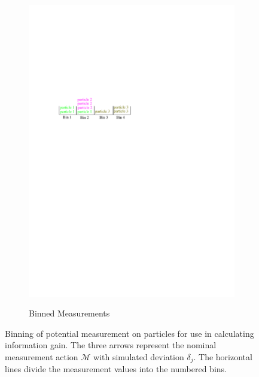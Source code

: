 \documentclass[letterpaper, 10 pt, conference]{ieeeconf}
\newcommand{\subcap}[1]{\textbf{(\subref{#1})}}
\newcommand{\maction}{\mathcal{M}}
\begin{document}
\begin{figure}
\begin{subfigure}[b]{0.38\linewidth}
        \includegraphics[width=\linewidth, clip, trim=1.2in 7in 4.1in 3.7in]{bins_sorted}
        \label{figure:bins}
        \caption{Binned Measurements}
    \end{subfigure}
    \hspace*{\fill}
\caption{Binning of potential measurement on particles for use in calculating information gain. The three arrows represent the nominal measurement action $\maction$ with simulated deviation $\delta_j$. The horizontal lines divide the measurement values into the numbered bins.}
\label{fig:bins}
\end{figure}
\end{document}
